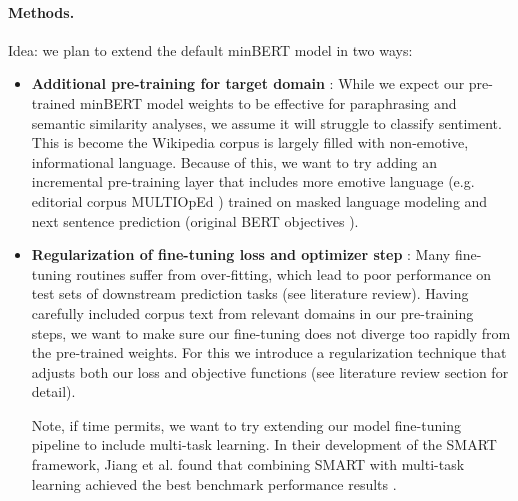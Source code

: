 \documentclass{article}
\begin{document}

\paragraph{Methods.}
Idea: we plan to extend the default minBERT model in two ways:

\begin{itemize}
    \item \textbf{Additional pre-training for target domain} \cite{pretrain}: While we expect our pre-trained minBERT model weights to be effective for paraphrasing and semantic similarity analyses, we assume it will struggle to classify sentiment. This is become the Wikipedia corpus is largely filled with non-emotive, informational language. Because of this, we want to try adding an incremental pre-training layer that includes more emotive language (e.g. editorial corpus MULTIOpEd \cite{multioped}) trained on masked language modeling and next sentence prediction (original BERT objectives \cite{bert}). 
    
    \item \textbf{Regularization of fine-tuning loss and optimizer step} \cite{smart}: Many fine-tuning routines suffer from over-fitting, which lead to poor performance on test sets of downstream prediction tasks (see literature review). Having carefully included corpus text from relevant domains in our pre-training steps, we want to make sure our fine-tuning does not diverge too rapidly from the pre-trained weights. For this we introduce a regularization technique that adjusts both our loss and objective functions (see literature review section for detail).
    

    Note, if time permits, we want to try extending our model fine-tuning pipeline to include multi-task learning. In their development of the SMART framework, Jiang et al. found that combining SMART with multi-task learning achieved the best benchmark performance results \cite{smart}.
    
\end{itemize}
\end{document}
